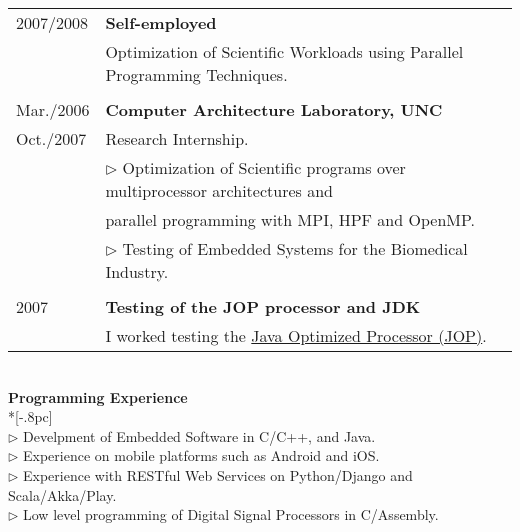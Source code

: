 \documentclass[letter,11pt,english]{article}
\begin{document}
\begin{tabular}{ p{2cm} l }

   2007/2008    & {\bf Self-employed}\\
		& Optimization of Scientific Workloads using Parallel Programming Techniques.\\
\\
   Mar./2006    & {\bf Computer Architecture Laboratory, UNC}\\
   Oct./2007    & Research Internship.\\
		&$\triangleright$ Optimization of Scientific programs over multiprocessor architectures and\\
		& parallel programming with MPI, HPF and OpenMP.\\
		&$\triangleright$ Testing of Embedded Systems for the Biomedical Industry.\\
\\
   2007         &{\bf Testing of the JOP processor and JDK}\\
		& I worked testing the \href{http://jopdesign.com}{Java Optimized Processor (JOP)}.
\\
\end{tabular}					
\\


{\large \bf Programming Experience} \\*[-.8pc]
\underline{\hspace{6in}} \\
$\triangleright$ Develpment of Embedded Software in C/C++, and Java.\\
$\triangleright$ Experience on mobile platforms such as Android and iOS.\\
$\triangleright$ Experience with RESTful Web Services on Python/Django and Scala/Akka/Play.\\
$\triangleright$ Low level programming of Digital Signal Processors in C/Assembly.\\
\end{document}
